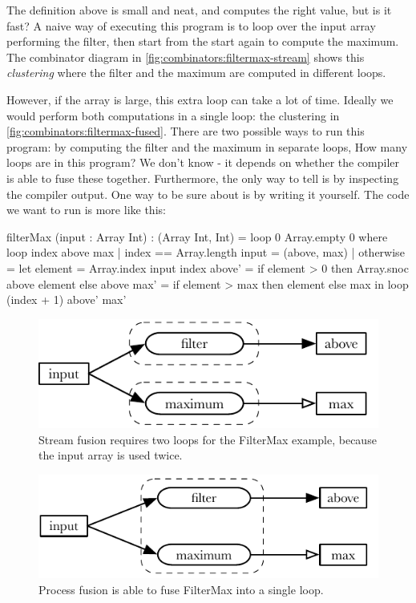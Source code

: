 The definition above is small and neat, and computes the right value, but is it fast?
A naive way of executing this program is to loop over the input array performing the filter, then start from the start again to compute the maximum.
The combinator diagram in \autoref{fig:combinators:filtermax-stream} shows this \emph{clustering} where the filter and the maximum are computed in different loops.

However, if the array is large, this extra loop can take a lot of time.
Ideally we would perform both computations in a single loop: the clustering in \autoref{fig:combinators:filtermax-fused}.
There are two possible ways to run this program: by computing the filter and the maximum in separate loops, 
How many loops are in this program? We don't know - it depends on whether the compiler is able to fuse these together.
Furthermore, the only way to tell is by inspecting the compiler output.
One way to be sure about is by writing it yourself.
The code we want to run is more like this:

\begin{code}
filterMax (input : Array Int) : (Array Int, Int)
 = loop 0 Array.empty 0
 where
  loop index above max
   | index == Array.length input
   = (above, max)
   | otherwise
   = let element = Array.index input index
         above'  = if element > 0
                   then Array.snoc above element
                   else above
         max'    = if element > max
                   then element
                   else max
     in  loop (index + 1) above' max'
\end{code}




\begin{figure}
\center
\includegraphics{figs/combinators/filtermax-stream.pdf}
\caption{Stream fusion requires two loops for the FilterMax example, because the input array is used twice.}
\label{fig:combinators:filtermax-stream}
\end{figure}

\begin{figure}
\center
\includegraphics{figs/combinators/filtermax-fused.pdf}
\caption{Process fusion is able to fuse FilterMax into a single loop.}
\label{fig:combinators:filtermax-fused}
\end{figure}

